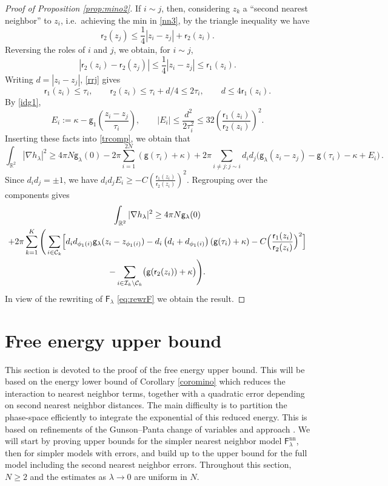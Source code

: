 \documentclass[a4paper,10pt,leqno]{amsart}
\numberwithin{equation}{section}
\newcommand{\R}{\mathbb{R}}
\def\nab{\nabla}
\def\g{\mathsf{g}}
\def\F{\mathsf{F}}
\def\rr{\mathsf{r}}
\def\nn{\mathrm{nn}}
\begin{document}
\begin{proof}[Proof of Proposition \ref{prop:mino2}]
  If $i\sim j$, then, considering $z_k$ a ``second nearest neighbor'' to $z_i$, i.e.~achieving the min in \eqref{nn3}, by the triangle inequality we have
  \begin{equation*}\rr_2 (z_j) \le \frac14|z_i-z_j|+\rr_2(z_i).\end{equation*}
  Reversing the roles of $i$ and $j$, we obtain, for $i \sim j$,
  \begin{equation}\label{rrj}|\rr_2(z_i)-\rr_2(z_j)|\le \frac14|z_i-z_j| \le \rr_{1} (z_i) . \end{equation}
  Writing $d=|z_i-z_j|$, \eqref{rrj} gives
  \[
    \rr_1(z_i)\le\tau_i,\qquad
    \rr_2(z_i)\le\tau_i+d/4\le2\tau_i,\qquad
    d\le4\rr_1(z_i).
  \]
  By \eqref{idg1},
  \[
    E_i:=\kappa-\g_1\left(\frac{z_i-z_j}{\tau_i}\right),\qquad
    |E_i|\le\frac{d^2}{2\tau_i^2}
    \le32\left(\frac{\rr_1(z_i)}{\rr_2(z_i)}\right)^2.
  \]
  Inserting these facts into \eqref{trcomp}, we obtain that
  \[
    \int_{\R^2} |\nab h_{\lambda}|^2
    \ge 4\pi N \g_\lambda(0) - 2\pi
    \sum_{i=1}^{2N} ( \g(\tau_i)+\kappa)+
    2\pi \sum_{i\neq j:j \sim i }
    d_i d_j \Bigg( \g_\lambda ( z_i-z_j) - \g(\tau_i) -\kappa + E_i \Bigg)\,.
  \]
  Since $d_id_j=\pm1$, we have $d_id_jE_i\ge-C(\frac{\rr_1(z_i)}{\rr_2(z_i)})^2$. Regrouping over the components gives
  \begin{multline*}
    \int_{\R^2} |\nab h_{\lambda}|^2
    \ge 4\pi N \g_\lambda(0) \\ +
    2\pi\sum_{k=1}^K \Bigg( \sum_{i\in \mathcal C_k} \Bigl[d_i d_{\phi_1(i)} \g_\lambda(z_i-z_{\phi_1(i)} ) -d_i \left( d_i+ d_{\phi_1(i)} \right)( \g(\tau_i) +\kappa) -C\Bigl(\frac{\rr_1(z_i)}{\rr_2(z_i)}\Bigr)^2\Bigr]
    \\
    -\sum_{i\in \mathcal{I}_k \backslash \mathcal C_k} \bigl(\g(\rr_2(z_i))+\kappa\bigr) \Bigg).
  \end{multline*}
  In view of the rewriting of $\F_\lambda$ \eqref{eq:rewrF} we obtain the result.

\end{proof}

\section{Free energy upper bound}\label{sec3}

This section is devoted to the proof of the free energy upper bound.
This will be based on the energy lower bound of Corollary \ref{coromino} which reduces the interaction to nearest neighbor terms, together with a quadratic error depending on second nearest neighbor distances. The main difficulty is to partition the phase-space efficiently to integrate the exponential of this reduced energy. This is based on refinements of the Gunson--Panta change of variables and approach \cite{GunPan}.
We will start by proving upper bounds for the simpler nearest neighbor model $\F_\lambda^\nn$, then for simpler models with errors, and build up to the upper bound for the full model including the second nearest neighbor errors.
Throughout this section, $N\ge2$ and the estimates as $\lambda\to0$ are uniform in $N$.
\end{document}
